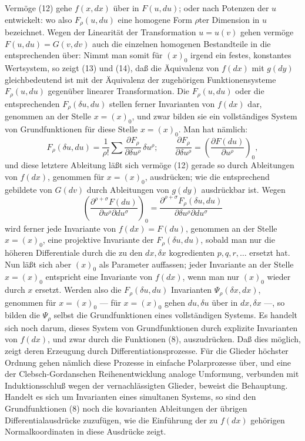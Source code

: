 Vermöge (12) gehe \(f(x,dx)\) über in \(F(u,du)\); oder nach Potenzen
der \(u\) entwickelt:
wo also \(F_\rho(u,du)\) eine homogene Form \(\rho\)ter Dimension in
\(u\) bezeichnet. Wegen der Linearität der Transformation \(u=u(v)\)
gehen vermöge \(F(u,du)=G(v,dv)\) auch die einzelnen homogenen
Bestandteile in die entsprechenden über:
Nimmt man somit für \((x)_0\) irgend ein festes, konstantes
Wertsystem, so zeigt (13) und (14), daß die Äquivalenz von \(f(dx)\)
mit \(g(dy)\) gleichbedeutend ist mit der Äquivalenz der zugehörigen
Funktionensysteme \(F_\rho(u,du)\) gegenüber linearer Transformation.
Die \(F_\rho(u,du)\) oder die entsprechenden \(F_\rho(\delta u,du)\)
stellen ferner Invarianten von \(f(dx)\) dar, genommen an der Stelle
\(x=(x)_0\), und zwar bilden sie ein vollständiges System von
Grundfunktionen für diese Stelle \(x=(x)_0\). Man hat nämlich:
\[
F_\rho(\delta u,du)=\frac1{\rho!}\sum
\frac{\partial F_\rho}{\partial \delta u^\rho}\,\delta u^\rho;
\qquad
\frac{\partial F_\rho}{\partial \delta u^\rho}
=\left(\frac{\partial F(du)}{\partial u^\rho}\right)_0,
\]
und diese letztere Ableitung läßt sich vermöge (12) gerade so durch
Ableitungen von \(f(dx)\), genommen für \(x=(x)_0\), ausdrücken; wie
die entsprechend gebildete von \(G(dv)\) durch Ableitungen von \(g(dy)\)
ausdrückbar ist. Wegen
\[
\left(\frac{\partial^{\rho+\sigma}F(du)}
{\partial u^\rho\partial du^\sigma}\right)_0
=
\frac{\partial^{\rho+\sigma}F_\rho(\delta u,du)}
{\partial\delta u^\rho\partial du^\sigma}
\]
wird ferner jede Invariante von \(f(dx)=F(du)\), genommen an der Stelle
\(x=(x)_0\), eine projektive Invariante der \(F_\rho(\delta u,du)\),
sobald man nur die höheren Differentiale durch die zu den \(dx,\delta x\)
kogredienten \(p,q,r,\ldots\) ersetzt hat. Nun läßt sich aber \((x)_0\)
als Parameter auffassen; jeder Invariante an der Stelle \(x=(x)_0\)
entspricht eine Invariante von \(f(dx)\), wenn man nur \((x)_0\) wieder
durch \(x\) ersetzt. Werden also die \(F_\rho(\delta u,du)\) Invarianten
\(\Psi_\rho(\delta x,dx)\), genommen für \(x=(x)_0\) --- für \(x=(x)_0\)
gehen \(du,\delta u\) über in \(dx,\delta x\) ---, so bilden die
\(\Psi_\rho\) selbst die Grundfunktionen eines vollständigen Systems.
Es handelt sich noch darum, dieses System von Grundfunktionen durch
explizite Invarianten von \(f(dx)\), und zwar durch die Funktionen (8),
auszudrücken. Daß dies möglich, zeigt deren Erzeugung durch
Differentiationsprozesse. Für die Glieder höchster Ordnung gehen
nämlich diese Prozesse in einfache Polarprozesse über, und eine der
Clebsch-Gordanschen Reihenentwicklung analoge Umformung, verbunden mit
Induktionsschluß wegen der vernachlässigten Glieder, beweist die
Behauptung. Handelt es sich um Invarianten eines simultanen Systems, so
sind den Grundfunktionen (8) noch die kovarianten Ableitungen der
übrigen Differentialausdrücke zuzufügen, wie die Einführung der zu
\(f(dx)\) gehörigen Normalkoordinaten in diese Ausdrücke zeigt.

